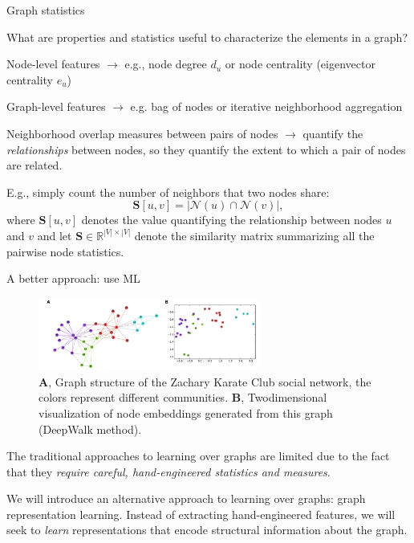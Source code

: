 \documentclass[10pt, aspectratio=169, compress, protectframetitle, handout]{beamer}
\begin{document}
\begin{frame}{Graph statistics}

    What are properties and statistics useful to characterize the elements in a graph?
    
    \alert{Node-level features} $\longrightarrow$ e.g., node degree $d_u$ or node centrality (eigenvector centrality $e_u$)
    
    \alert{Graph-level features} $\longrightarrow$ e.g. bag of nodes or iterative neighborhood aggregation

    \alert{Neighborhood overlap measures} between pairs of nodes $\longrightarrow$ quantify the \emph{relationships} between nodes, so they quantify the extent to which a pair of nodes are related.
    
    \begin{block}{}%
    E.g., simply count the number of neighbors that two nodes share:
    \begin{equation}
        \mathbf S[u, v] = |\mathcal N(u) \cap \mathcal N(v)|,
    \end{equation}
    where $\mathbf S[u, v]$ denotes the value quantifying the relationship between nodes $u$ and $v$ and let $\mathbf S \in \mathbb R^{|V| \times |V|}$ denote the \alert{similarity matrix} summarizing all the pairwise node statistics.
    \end{block}
    
\end{frame}


\begin{frame}{A better approach: use ML}
    
    \begin{figure}
        \centering
        \includegraphics[width=0.65\textwidth]{figures/Node_embedding_example.png}
        \caption{\textbf A, Graph structure of the Zachary Karate Club social network, the colors represent different communities. \textbf B, Twodimensional visualization of node embeddings generated from this graph (DeepWalk method).}
        \label{fig:nodeembeddingex}
    \end{figure}
    
    The traditional approaches to learning over graphs are limited due to the fact that they \emph{require careful, hand-engineered statistics and measures}.
    
    We will introduce an alternative approach to learning over graphs: \alert{graph representation learning}. Instead of extracting hand-engineered features, we will seek to \emph{learn} representations that encode structural information about the graph.
    
\end{frame}
\end{document}
